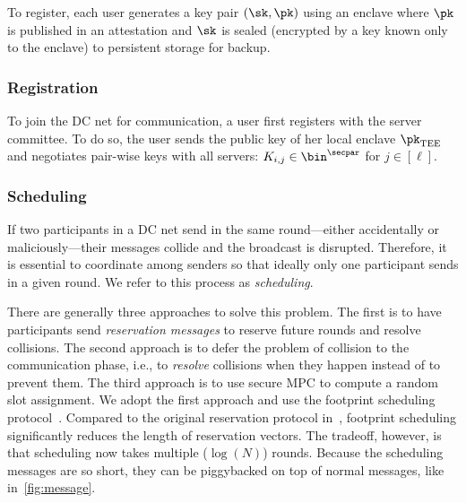 To register, each user generates a key pair $(\sk, \pk)$ using an enclave where $\pk$ is published in an attestation and $\sk$ is sealed (encrypted by a key known only to the enclave) to persistent storage for backup.

\subsubsection{Registration}
To join the DC net for communication, a user first registers with the server committee. To do so, the user sends the public key of her local enclave $\enclavekey$ and negotiates pair-wise keys with all servers: $K_{i,j} \in \bin^\secpar$ for $j\in [\ell]$.


\subsubsection{Scheduling}

If two participants in a DC net send in the same round---either accidentally or maliciously---their messages collide and the broadcast is disrupted. Therefore, it is essential to coordinate among senders so that ideally only one participant sends in a given round. We refer to this process as {\em scheduling}.

There are generally three approaches to solve this problem. The first is to have participants send {\em reservation messages} to reserve future rounds and resolve collisions. The second approach is to defer the problem of collision to the communication phase, i.e., to {\em resolve} collisions when they happen instead of to prevent them. The third approach is to use secure MPC to compute a random slot assignment. We adopt the first approach and use the footprint scheduling protocol~\cite{}.  Compared to the original reservation protocol in~\cite{JC:Chaum88}, footprint scheduling significantly reduces the length of reservation vectors. The tradeoff, however, is that scheduling now takes multiple ($\log(N)$) rounds. Because the scheduling messages are so short, they can be piggybacked on top of normal messages, like in~\cref{fig:message}.


